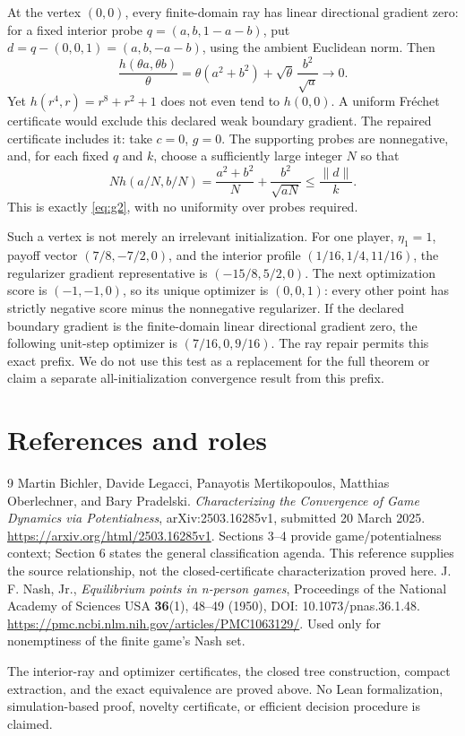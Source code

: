 \documentclass[11pt,a4paper]{article}
\begin{document}
At the vertex \((0,0)\), every finite-domain ray has linear directional
gradient zero: for a fixed interior probe \(q=(a,b,1-a-b)\), put
\(d=q-(0,0,1)=(a,b,-a-b)\), using the ambient Euclidean norm. Then
\[
\frac{h(\theta a,\theta b)}{\theta}
=\theta(a^2+b^2)+\sqrt\theta\,\frac{b^2}{\sqrt a}
\longrightarrow0.
\]
Yet \(h(r^4,r)=r^8+r^2+1\) does not even tend to \(h(0,0)\).
A uniform Fr\'echet certificate would exclude this declared weak boundary
gradient. The repaired certificate includes it: take \(c=0\), \(g=0\).
The supporting probes are nonnegative, and, for each fixed \(q\) and \(k\),
choose a sufficiently large integer \(N\) so that
\[
N h(a/N,b/N)=\frac{a^2+b^2}{N}+\frac{b^2}{\sqrt{aN}}
\le\frac{\|d\|}{k}.
\]
This is exactly \eqref{eq:g2}, with no uniformity over probes required.

Such a vertex is not merely an irrelevant initialization. For one player,
\(\eta_1=1\), payoff vector \((7/8,-7/2,0)\), and the interior profile
\((1/16,1/4,11/16)\), the regularizer gradient representative is
\((-15/8,5/2,0)\). The next optimization score is \((-1,-1,0)\),
so its unique optimizer is \((0,0,1)\): every other point has strictly
negative score minus the nonnegative regularizer. If the declared boundary
gradient is the finite-domain linear directional gradient zero, the following
unit-step optimizer is \((7/16,0,9/16)\). The ray repair permits this exact
prefix. We do not use this test as a replacement for the full theorem or claim
a separate all-initialization convergence result from this prefix.

\section{References and roles}

\begin{thebibliography}{9}
Martin Bichler, Davide Legacci, Panayotis Mertikopoulos,
Matthias Oberlechner, and Bary Pradelski.
\emph{Characterizing the Convergence of Game Dynamics via Potentialness},
arXiv:2503.16285v1, submitted 20 March 2025.
\url{https://arxiv.org/html/2503.16285v1}.
Sections 3--4 provide game/potentialness context; Section 6 states the general
classification agenda. This reference supplies the source relationship, not
the closed-certificate characterization proved here.
J. F. Nash, Jr., \emph{Equilibrium points in n-person games},
Proceedings of the National Academy of Sciences USA \textbf{36}(1), 48--49
(1950), DOI: 10.1073/pnas.36.1.48.
\url{https://pmc.ncbi.nlm.nih.gov/articles/PMC1063129/}.
Used only for nonemptiness of the finite game's Nash set.
\end{thebibliography}

The interior-ray and optimizer certificates, the closed tree construction, compact
extraction, and the exact equivalence are proved above. No Lean formalization,
simulation-based proof, novelty certificate, or efficient decision procedure is
claimed.
\end{document}
